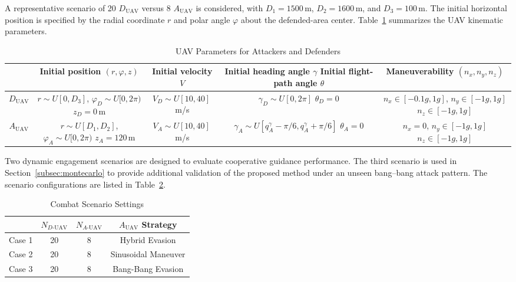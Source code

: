 \documentclass[lettersize,journal]{IEEEtran}
\begin{document}
A representative scenario of 20 $D_{\text{UAV}}$ versus 8 $A_{\text{UAV}}$ is considered, with $D_1=1500$\,m,
$D_2=1600$\,m, and $D_3=100$\,m.
The initial horizontal position is specified by the radial coordinate $r$ and polar angle $\varphi$ about the defended-area center.
Table~\ref{chushicanshu} summarizes the UAV kinematic parameters.

\begin{table}[!t]
\centering
\caption{UAV Parameters for Attackers and Defenders}
\label{chushicanshu}
\renewcommand{\arraystretch}{1.6}
\footnotesize
\setlength{\tabcolsep}{3pt}
\begin{tabular}{ccccc}
\hline\hline
 & Initial position $(r,\varphi,z)$ & Initial velocity $V$ & \shortstack{Initial heading angle $\gamma$\\ Initial flight-path angle $\theta$} & \shortstack{Maneuverability\\ $(n_x,n_y,n_z)$} \\ \hline
$D_{\text{UAV}}$ & \shortstack{$r\sim U[0,D_3]$, $\varphi_D\sim U[0,2\pi)$\\ $z_D=0$\,m} & $V_D\sim U[10,40]$\,m/s & \shortstack{$\gamma_D\sim U[0,2\pi]$\\ $\theta_D=0$} & \shortstack{$n_x\in[-0.1g,1g]$, $n_y\in[-1g,1g]$\\ $n_z\in[-1g,1g]$} \\
$A_{\text{UAV}}$ & \shortstack{$r\sim U[D_1,D_2]$, $\varphi_A\sim U[0,2\pi)$\\ $z_A=120$\,m} & $V_A\sim U[10,40]$\,m/s & \shortstack{$\gamma_A\sim U[q_A^{\gamma}-\pi/6,q_A^{\gamma}+\pi/6]$\\ $\theta_A=0$} & \shortstack{$n_x=0$, $n_y\in[-1g,1g]$\\ $n_z\in[-1g,1g]$} \\ \hline
\end{tabular}
\end{table}

Two dynamic engagement scenarios are designed to evaluate cooperative guidance performance.
The third scenario is used in Section~\ref{subsec:montecarlo} to provide additional validation of the proposed method under an unseen bang--bang attack pattern.
The scenario configurations are listed in Table~\ref{changjingqingkuang}.


\begin{table}[!t]
\centering
\renewcommand{\arraystretch}{1.4}
\caption{Combat Scenario Settings}
\label{changjingqingkuang}
\begin{tabular}{cccc}
\hline\hline
 & $N_{D\text{-UAV}}$ & $N_{A\text{-UAV}}$ & $A_{\text{UAV}}$ Strategy \\ \hline
Case 1 & 20 & 8 & Hybrid Evasion \\
Case 2 & 20 & 8 & Sinusoidal Maneuver \\
Case 3 & 20 & 8 & Bang-Bang Evasion \\ \hline
\end{tabular}
\end{table}
\end{document}
